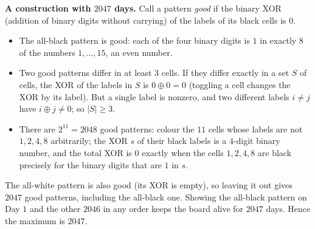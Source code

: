 \textbf{A construction with $2047$ days.} Call a pattern \emph{good} if the binary XOR (addition of binary digits without carrying) of the labels of its black cells is $0$.
\begin{itemize}
\item The all-black pattern is good: each of the four binary digits is $1$ in exactly $8$ of the numbers $1,\dots,15$, an even number.
\item Two good patterns differ in at least $3$ cells. If they differ exactly in a set $S$ of cells, the XOR of the labels in $S$ is $0\oplus0=0$ (toggling a cell changes the XOR by its label). But a single label is nonzero, and two different labels $i\ne j$ have $i\oplus j\ne0$; so $|S|\ge3$.
\item There are $2^{11}=2048$ good patterns: colour the $11$ cells whose labels are not $1,2,4,8$ arbitrarily; the XOR $s$ of their black labels is a $4$-digit binary number, and the total XOR is $0$ exactly when the cells $1,2,4,8$ are black precisely for the binary digits that are $1$ in $s$.
\end{itemize}
The all-white pattern is also good (its XOR is empty), so leaving it out gives $2047$ good patterns, including the all-black one. Showing the all-black pattern on Day $1$ and the other $2046$ in any order keeps the board alive for $2047$ days. Hence the maximum is $2047$.
